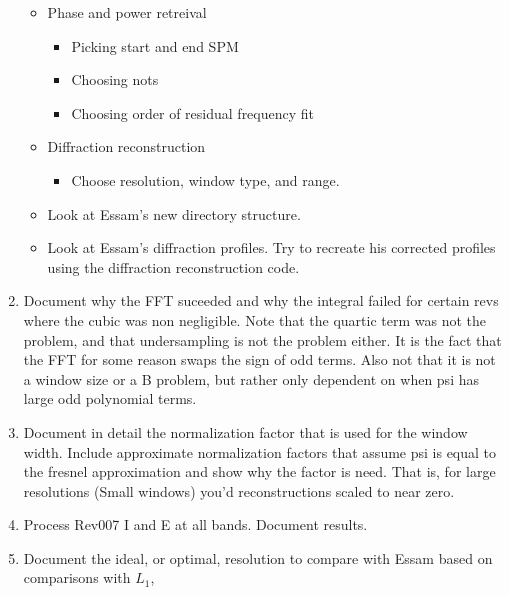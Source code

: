 \documentclass[crop=false,class=article,oneside]{standalone}
\begin{document}
\begin{enumerate}
\begin{itemize}
\begin{itemize}
                \end{itemize}
                \item Phase and power retreival
                \begin{itemize}
                    \item Picking start and end SPM
                    \item Choosing nots
                    \item Choosing order of residual frequency fit
                \end{itemize}
                \item Diffraction reconstruction
                \begin{itemize}
                    \item Choose resolution, window type, and range.
                \end{itemize}
                \item Look at Essam's new directory structure.
                \item Look at Essam's diffraction profiles. Try to recreate his corrected profiles using the diffraction reconstruction code.
            \end{itemize}
            \item Document why the FFT suceeded and why the
                  integral failed for certain revs where the cubic was
                  non negligible. Note that the quartic term was not
                  the problem, and that undersampling is not the
                  problem either. It is the fact that the FFT for
                  some reason swaps the sign of odd terms. Also not
                  that it is not a window size or a B problem, but
                  rather only dependent on when psi has large odd
                  polynomial terms.
            \item Document in detail the normalization factor that
                  is used for the window width. Include approximate
                  normalization factors that assume psi is equal to
                  the fresnel approximation and show why the factor
                  is need. That is, for large resolutions
                  (Small windows) you'd reconstructions scaled
                  to near zero.
            \item Process Rev007 I and E at all bands. Document results.
            \item Document the ideal, or optimal, resolution to compare
                  with Essam based on comparisons with $L_{1}$,

\end{enumerate}
\end{document}
